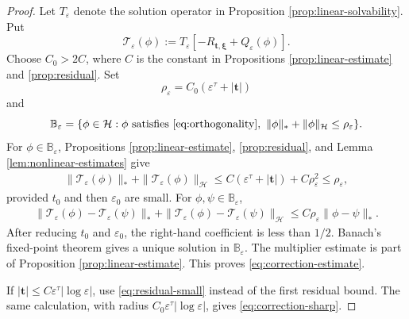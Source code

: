 \documentclass[11pt]{article}
\numberwithin{equation}{section}
\begin{document}
\begin{proof}
Let $T_\varepsilon$ denote the solution operator in Proposition
\ref{prop:linear-solvability}. Put
\begin{equation*}
\mathscr T_\varepsilon(\phi)
:=T_\varepsilon[-R_{\boldsymbol t,\boldsymbol\xi}
+Q_\varepsilon(\phi)].
\end{equation*}
Choose $C_0>2C$, where $C$ is the constant in Propositions
\ref{prop:linear-estimate} and \ref{prop:residual}. Set
\begin{equation*}
\rho_\varepsilon
=C_0(\varepsilon^\tau+|\boldsymbol t|)
\end{equation*}
and
\[
\mathbb B_\varepsilon
=\{\phi\in\mathcal H:\phi\text{ satisfies }
\eqref{eq:orthogonality},\
\|\phi\|_*+\|\phi\|_\mathcal H\leq\rho_\varepsilon\}.
\]
For $\phi\in\mathbb B_\varepsilon$, Propositions
\ref{prop:linear-estimate}, \ref{prop:residual}, and Lemma
\ref{lem:nonlinear-estimates} give
\begin{equation*}
\begin{aligned}
\|\mathscr T_\varepsilon(\phi)\|_*
+\|\mathscr T_\varepsilon(\phi)\|_\mathcal H
\leq C(\varepsilon^\tau+|\boldsymbol t|)
+C\rho_\varepsilon^2\leq\rho_\varepsilon,
\end{aligned}
\end{equation*}
provided $t_0$ and then $\varepsilon_0$ are small. For
$\phi,\psi\in\mathbb B_\varepsilon$,
\begin{equation}\label{eq:fixed-point-contraction}
\begin{aligned}
\|\mathscr T_\varepsilon(\phi)
-\mathscr T_\varepsilon(\psi)\|_*
+\|\mathscr T_\varepsilon(\phi)
-\mathscr T_\varepsilon(\psi)\|_\mathcal H
\leq C\rho_\varepsilon\|\phi-\psi\|_*.
\end{aligned}
\end{equation}
After reducing $t_0$ and $\varepsilon_0$, the right-hand coefficient
is less than $1/2$. Banach's fixed-point theorem gives a unique
solution in $\mathbb B_\varepsilon$. The multiplier estimate is part
of Proposition \ref{prop:linear-estimate}. This proves
\eqref{eq:correction-estimate}.

If
$|\boldsymbol t|\leq C\varepsilon^\tau|\log\varepsilon|$, use
\eqref{eq:residual-small} instead of the first residual bound. The
same calculation, with radius
$C_0\varepsilon^\tau|\log\varepsilon|$, gives
\eqref{eq:correction-sharp}.


\end{proof}
\end{document}
